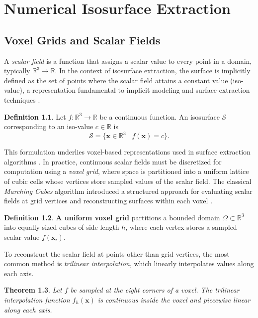 \documentclass[12pt, a4paper, oneside]{book}
\theoremstyle{plain}
\newtheorem{theorem}{Theorem}[chapter]
\theoremstyle{definition}
\newtheorem{definition}[theorem]{Definition}
\theoremstyle{remark}
\theoremstyle{definition}
\begin{document}
\chapter{Numerical Isosurface Extraction}
\label{ch:extraction}
\section{Voxel Grids and Scalar Fields}

A \emph{scalar field} is a function that assigns a scalar value to every point in a domain, typically $\mathbb{R}^3 \rightarrow \mathbb{R}$. In the context of isosurface extraction, the surface is implicitly defined as the set of points where the scalar field attains a constant value (iso-value), a representation fundamental to implicit modeling and surface extraction techniques \cite{bloomenthal1997introduction}.

\begin{definition}
Let $f:\mathbb{R}^3 \rightarrow \mathbb{R}$ be a continuous function. An isosurface $\mathcal{S}$ corresponding to an iso-value $c \in \mathbb{R}$ is
\[
\mathcal{S} = \{ \mathbf{x} \in \mathbb{R}^3 \mid f(\mathbf{x}) = c \}.
\]
\end{definition}

This formulation underlies voxel-based representations used in surface extraction algorithms \cite{bloomenthal1997introduction,lorensen1998marching}. In practice, continuous scalar fields must be discretized for computation using a \emph{voxel grid}, where space is partitioned into a uniform lattice of cubic cells whose vertices store sampled values of the scalar field. The classical \emph{Marching Cubes} algorithm introduced a structured approach for evaluating scalar fields at grid vertices and reconstructing surfaces within each voxel \cite{lorensen1998marching}.

\begin{definition}
\textbf{A uniform voxel grid} partitions a bounded domain $\Omega \subset \mathbb{R}^3$ into
equally sized cubes of side length $h$, where each vertex stores a sampled scalar value $f(\mathbf{x}_i)$.
\end{definition}

To reconstruct the scalar field at points other than grid vertices, the most common method is \emph{trilinear interpolation}, which linearly interpolates values along each axis.

\begin{theorem}
Let $f$ be sampled at the eight corners of a voxel. The trilinear interpolation function $f_h(\mathbf{x})$ is continuous inside the voxel and piecewise linear along each axis.
\end{theorem}
\end{document}
